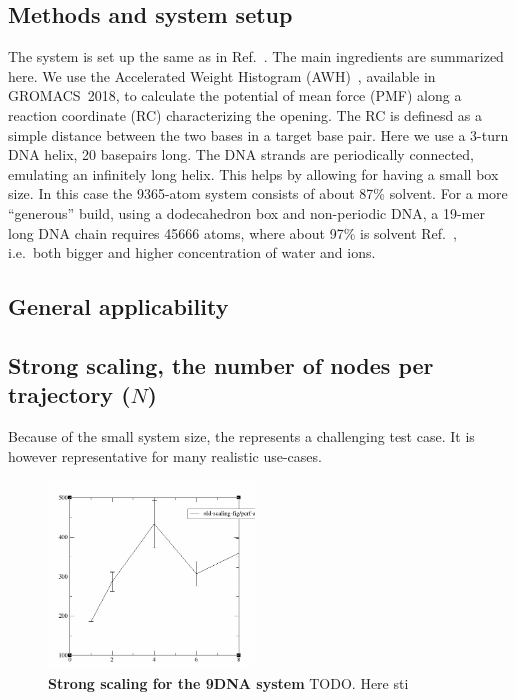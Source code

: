 \documentclass[11pt,a4paper]{article}
\begin{document}
\subsection{Methods and system setup}
The system is set up the same as in Ref.~\cite{lindahl2017sequence}. The main ingredients are summarized here.
We use the Accelerated Weight Histogram (AWH)~\cite{lindahl2014accelerated}, available in GROMACS~2018, to calculate the potential of mean force (PMF) along a reaction coordinate (RC) characterizing the opening. The RC is definesd as a simple distance between the two bases in a target base pair. %
Here we use a  3-turn DNA helix, 20 basepairs long. The DNA strands are periodically connected, emulating an infinitely long helix. This helps by allowing for having a small box size. In this case the 9365-atom system consists of about 87\% solvent. For a more ``generous'' build, using a dodecahedron box and non-periodic DNA, a 19-mer long DNA chain requires 45666 atoms, where about 97\% is solvent Ref.~\cite{lindahl2017sequence}, i.e.\ both bigger and higher concentration of water and ions.

\subsection{General applicability}
\cite{zhang2018accurate}

\subsection{Strong scaling, the number of nodes per trajectory ($N$)}
Because of the small system size, the represents a challenging test case. It is however representative for many realistic use-cases. 

\begin{figure}[thbp!]
\includegraphics[height=5cm]{figs/dna-strong-scaling-screenshot.png}
\caption{\label{fig:dnastrongscaling}
\textbf{Strong scaling for the 9DNA system} TODO. Here sti
}
\end{figure}
\end{document}
